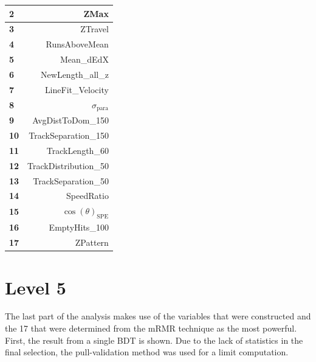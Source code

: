 \begin{table}[]
\begin{tabular}{|l|r|}
\textbf{2} & ZMax \\ \hline
\textbf{3} & ZTravel \\ \hline
\textbf{4} & RunsAboveMean \\ \hline
\textbf{5} & Mean\_dEdX \\ \hline
\textbf{6} & NewLength\_all\_z \\ \hline
\textbf{7} & LineFit\_Velocity \\ \hline
\textbf{8} & $\sigma_\textrm{para}$ \\ \hline
\textbf{9} & AvgDistToDom\_150 \\ \hline
\textbf{10} & TrackSeparation\_150 \\ \hline
\textbf{11} & TrackLength\_60 \\ \hline
\textbf{12} & TrackDistribution\_50 \\ \hline
\textbf{13} & TrackSeparation\_50 \\ \hline
\textbf{14} & SpeedRatio \\ \hline
\textbf{15} & $\cos(\theta)_\textrm{SPE}$ \\ \hline
\textbf{16} & EmptyHits\_100 \\ \hline
\textbf{17} & ZPattern \\ \hline
\end{tabular}
\end{table}


\section{Level 5}
The last part of the analysis makes use of the variables that were constructed and the 17 that were determined from the mRMR technique as the most powerful. First, the result from a single BDT is shown. Due to the lack of statistics in the final selection, the pull-validation method was used for a limit computation.

